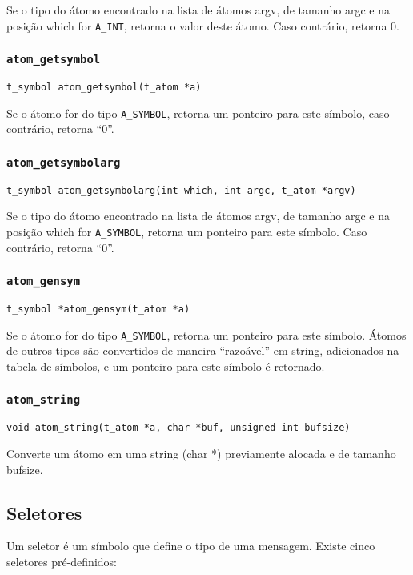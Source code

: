 Se o tipo do átomo encontrado na lista de átomos argv, de tamanho argc e na
posição which for \texttt{A\_INT}, retorna o valor deste átomo.
Caso contrário, retorna 0.

\subsubsection{\texttt{atom\_getsymbol}}
\texttt{t\_symbol atom\_getsymbol(t\_atom *a)}

Se o átomo for do tipo \texttt{A\_SYMBOL}, retorna um ponteiro para este símbolo, caso
contrário, retorna ``0''.

\subsubsection{\texttt{atom\_getsymbolarg}}
\texttt{t\_symbol atom\_getsymbolarg(int which, int argc, t\_atom *argv)}

Se o tipo do átomo encontrado na lista de átomos argv, de tamanho argc e na
posição which for \texttt{A\_SYMBOL}, retorna um ponteiro para este símbolo.
Caso contrário, retorna ``0''.

\subsubsection{\texttt{atom\_gensym}}
\texttt{t\_symbol *atom\_gensym(t\_atom *a)}

Se o átomo for do tipo \texttt{A\_SYMBOL}, retorna um ponteiro para este símbolo.
Átomos de outros tipos são convertidos de maneira ``razoável'' em string,
adicionados na tabela de símbolos, e um ponteiro para este símbolo é retornado.

\subsubsection{\texttt{atom\_string}}
\texttt{void atom\_string(t\_atom *a, char *buf, unsigned int bufsize)}

Converte um átomo em uma string (char *) previamente alocada e de tamanho bufsize.

\subsection{Seletores}

Um seletor é um símbolo que define o tipo de uma mensagem. Existe cinco
seletores pré-definidos:

